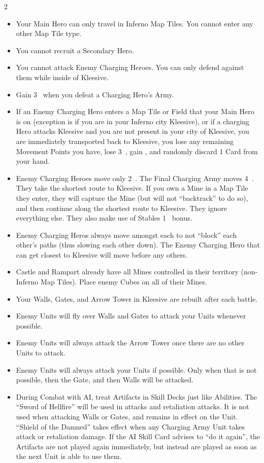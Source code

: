 \begin{multicols}{2}
\begin{itemize}
  \item Your Main Hero can only travel in Inferno Map Tiles. You cannot enter any other Map Tile type.
  \item You cannot recruit a Secondary Hero.
  \item You cannot attack Enemy Charging Heroes. You can only defend against them while inside of Kleesive.
  \item Gain 3~ when you defeat a Charging Hero's Army.
  \item If an Enemy Charging Hero enters a Map Tile or Field that your Main Hero is on (exception is if you are in
    your Inferno city Kleesive), or if a charging Hero attacks Kleesive and you are not present in your city
    of Kleesive, you are immediately transported back to Kleesive, you lose any remaining Movement Points
    you have, lose 3~, gain , and randomly discard 1 Card from your hand.
  \item Enemy Charging Heroes move only 2~. The Final Charging Army moves 4~. They take the shortest
    route to Kleesive. If you own a Mine in a Map Tile they enter, they will capture the Mine (but will not
    ``backtrack'' to do so), and then continue along the shortest route to Kleesive. They ignore everything
    else. They also make use of Stables 1~ bonus.
  \item Enemy Charging Heros always move amongst each to not ``block'' each other's paths (thus slowing each
    other down). The Enemy Charging Hero that can get closest to Kleesive will move before any others.
  \item Castle and Rampart already have all Mines controlled in their territory (non-Inferno Map Tiles). Place enemy
    Cubes on all of their Mines.
  \item Your Walls, Gates, and Arrow Tower in Kleesive are rebuilt after each battle.
  \columnbreak
  \item Enemy  Units will fly over Walls and Gates to attack your Units whenever possible.
  \item Enemy  Units will always attack the Arrow Tower once there are no other  Units to attack.
  \item Enemy Units will always attack your Units if possible. Only when that is not possible, then the Gate,
    and then Walls will be attacked.
  \item During Combat with AI, treat Artifacts in Skill Decks just like Abilities.
    The ``Sword of Hellfire'' will be used in attacks and retaliation attacks.
    It is not used when attacking Walls or Gates, and remains in effect on the Unit.
    ``Shield of the Damned'' takes effect when any Charging Army Unit takes attack or retaliation damage.
    If the AI Skill Card advises to ``do it again'', the Artifacts are not played again immediately, but instead are played as soon as the next Unit is able to use them.

\end{itemize}


\end{multicols}


